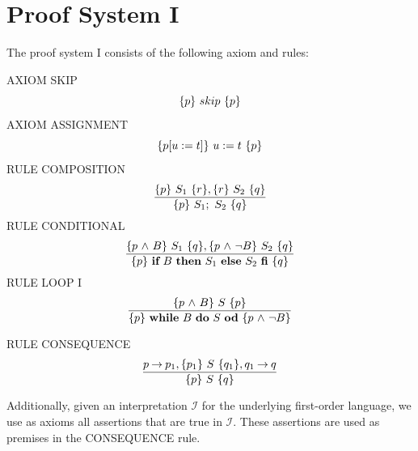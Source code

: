 \documentclass[manuscript, screen, review]{acmart}
\begin{document}
\section{Proof System I}
\label{sec:I}

The proof system I consists of the following axiom and rules:
\VV

\NI
AXIOM \label{rul:skip} SKIP
\[ \mbox{$\{{p}\}\ {skip}\ \{{p}\}$} \]
%
\NI
AXIOM \label{rul:assi} ASSIGNMENT
\[ \mbox{$\{{p[u:=t]}\}\ {u:=t}\ \{{p}\}$} \]
%
\NI
RULE \label{rul:comp} COMPOSITION
\[ \frac{ \mbox{$\{{p}\}\ {S_1}\ \{{r}\}$}, \mbox{$\{{r}\}\ {S_2}\ \{{q}\}$}                }
        { \mbox{$\{{p}\}\ {S_1;\ S_2}\ \{{q}\}$}                          }\]
%
\NI
RULE \label{rul:cond} CONDITIONAL
\[ \frac{ \mbox{$\{{p \mbox{$\ \wedge\ $} B}\}\ {S_1}\ \{{q}\}$}, \mbox{$\{{p \mbox{$\ \wedge\ $} \neg B}\}\ {S_2}\ \{{q}\}$}         }
        { \mbox{$\{{p}\}\ {\mbox{$\mbox{{\bf if}\ } {B} \mbox{\ {\bf then}\ } {S_1} \mbox{\ {\bf else}\ } {S_2}\ \mbox{{\bf fi}}$}}\ \{{q}\}$}                          }\]
%
\NI
RULE \label{rul:loop} LOOP I
\[ \frac{ \mbox{$\{{p \mbox{$\ \wedge\ $} B}\}\ {S}\ \{{p}\}$}                             }
        { \mbox{$\{{p}\}\ {\mbox{$\mbox{{\bf while}\ } {B}\ \mbox{{\bf do}\ } {S}\ \mbox{{\bf od}}$}}\ \{{p \mbox{$\ \wedge\ $} \neg B}\}$}               }\]
%

\NI
RULE \label{rul:cons} CONSEQUENCE
\[ \frac{ p \mbox{$\:\rightarrow\:$} p_1, \mbox{$\{{p_1}\}\ {S}\ \{{q_1}\}$}, q_1 \mbox{$\:\rightarrow\:$} q        }
        { \mbox{$\{{p}\}\ {S}\ \{{q}\}$}                                  }\]
%

Additionally, given an interpretation $\mathcal{I}$ for the underlying first-order language, 
we use as axioms all assertions that are true in $\mathcal{I}$. 
These assertions are used as premises in the CONSEQUENCE rule. 








\end{document}
